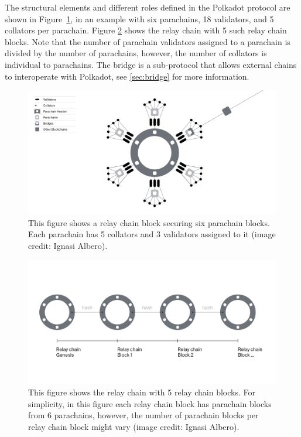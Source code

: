 \documentclass{article}
\begin{document}
The structural elements and different roles defined in the Polkadot protocol are shown in Figure~\ref{fig:roles}, in an example with six parachains, 18 validators, and 5 collators per parachain. Figure \ref{fig:relaychain} shows the relay chain with 5 such relay chain blocks. Note that the number of parachain validators assigned to a parachain is divided by the number of parachains, however, the number of collators is individual to parachains.  The bridge is a sub-protocol that allows external chains to interoperate with Polkadot, see \ref{sec:bridge} for more information. 
\begin{figure}[h]
	\centering
	\includegraphics[width=\textwidth]{Network2x.png}
	\caption{This figure shows a relay chain block securing six parachain blocks. Each parachain has  5 collators and 3 validators assigned to it (image credit: Ignasi Albero).}
	\label{fig:roles}
\end{figure}
\begin{figure}[h]
	\centering
	\includegraphics[width=\textwidth]{Relaychain.png}
	\caption{This figure shows the relay chain with 5 relay chain blocks. For simplicity, in this figure each relay chain block has parachain blocks from 6 parachains, however, the number of parachain blocks per relay chain block might vary (image credit: Ignasi Albero).}
	\label{fig:relaychain}
\end{figure}
\end{document}
